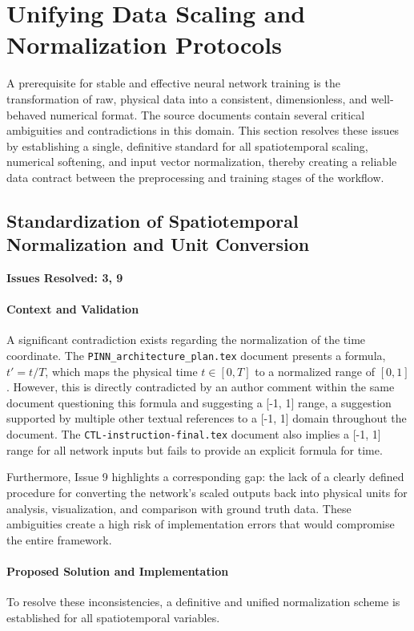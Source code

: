 \section{Unifying Data Scaling and Normalization Protocols}
A prerequisite for stable and effective neural network training is the transformation of raw, physical data into a consistent, dimensionless, and well-behaved numerical format. The source documents contain several critical ambiguities and contradictions in this domain. This section resolves these issues by establishing a single, definitive standard for all spatiotemporal scaling, numerical softening, and input vector normalization, thereby creating a reliable data contract between the preprocessing and training stages of the workflow.

\subsection{Standardization of Spatiotemporal Normalization and Unit Conversion}
\textbf{Issues Resolved: 3, 9}
\paragraph{Context and Validation}
A significant contradiction exists regarding the normalization of the time coordinate. The \texttt{PINN\_architecture\_plan.tex} document presents a formula, $t' = t/T$, which maps the physical time $t \in [0, T]$ to a normalized range of $[0, 1]$. However, this is directly contradicted by an author comment within the same document questioning this formula and suggesting a [-1, 1] range, a suggestion supported by multiple other textual references to a [-1, 1] domain throughout the document. The \texttt{CTL-instruction-final.tex} document also implies a [-1, 1] range for all network inputs but fails to provide an explicit formula for time.

Furthermore, Issue 9 highlights a corresponding gap: the lack of a clearly defined procedure for converting the network's scaled outputs back into physical units for analysis, visualization, and comparison with ground truth data. These ambiguities create a high risk of implementation errors that would compromise the entire framework.

\paragraph{Proposed Solution and Implementation}
To resolve these inconsistencies, a definitive and unified normalization scheme is established for all spatiotemporal variables.


